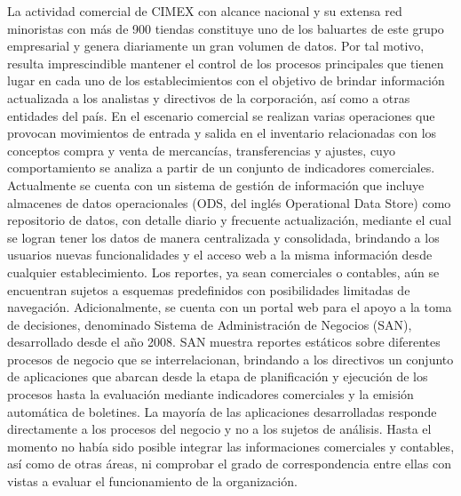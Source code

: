 \documentclass[preprint,12pt]{elsarticle}
\begin{document}
La actividad  comercial de  CIMEX con  alcance nacional  y su  extensa red  minoristas con  más de 900 tiendas constituye uno de los baluartes de este grupo empresarial y genera diariamente un gran volumen de datos. Por tal motivo, resulta imprescindible mantener el control de los procesos principales que tienen lugar  en  cada  uno  de los  establecimientos  con  el  objetivo  de  brindar información  actualizada  a  los analistas y directivos de la corporación, así como a otras entidades del país. En el escenario comercial se realizan varias operaciones que provocan movimientos de entrada y salida en el inventario relacionadas con  los  conceptos  compra  y  venta  de  mercancías,  transferencias  y  ajustes,  cuyo comportamiento  se analiza a partir de un conjunto de indicadores comerciales.   Actualmente  se  cuenta  con  un  sistema  de  gestión  de  información  que  incluye  almacenes  de  datos operacionales (ODS, del inglés Operational Data Store) como repositorio de datos, con detalle diario y frecuente actualización, mediante el cual se logran tener los datos de manera centralizada y consolidada, brindando a los usuarios nuevas funcionalidades y el acceso web a la misma información desde cualquier establecimiento. Los reportes,  ya sean comerciales o contables,  aún se encuentran sujetos a esquemas predefinidos con posibilidades limitadas de navegación.  Adicionalmente, se  cuenta con  un portal  web para  el apoyo  a la  toma  de decisiones,  denominado Sistema  de Administración  de Negocios  (SAN), desarrollado desde el año 2008. SAN muestra reportes estáticos sobre diferentes procesos de negocio que se interrelacionan, brindando a los directivos un conjunto de aplicaciones que abarcan desde la etapa de planificación  y  ejecución de  los  procesos hasta  la evaluación  mediante  indicadores  comerciales  y  la emisión automática de boletines.  La mayoría de las aplicaciones desarrolladas responde directamente a los procesos del negocio y no a los sujetos  de análisis.  Hasta el  momento no  había  sido  posible integrar  las informaciones  comerciales y contables, así como de  otras áreas,  ni comprobar  el grado de correspondencia entre  ellas con  vistas a evaluar  el  funcionamiento  de  la  organización.\\
\\
\end{document}
